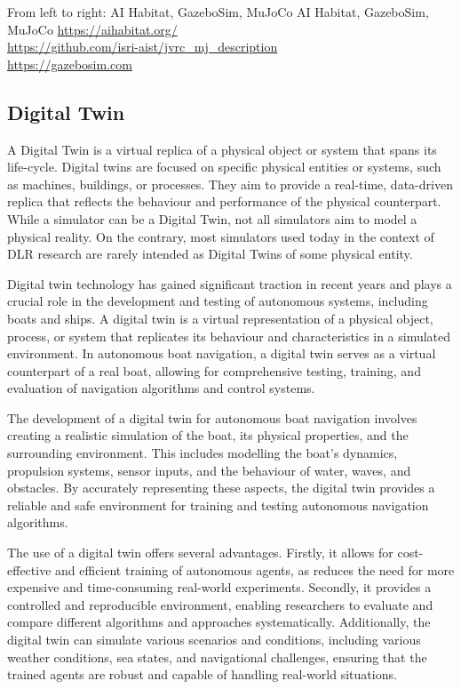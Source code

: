 {From left to right: AI Habitat, GazeboSim, MuJoCo}
{AI Habitat, GazeboSim, MuJoCo}
{
\url{https://aihabitat.org/} \\
\url{https://github.com/isri-aist/jvrc_mj_description} \\
\url{https://gazebosim.com} \\
}




\subsection{Digital Twin}

\begin{textblock}
A Digital Twin is a virtual replica of a physical object or system that spans its life-cycle. Digital twins are focused on specific physical entities or systems, such as machines, buildings, or processes. They aim to provide a real-time, data-driven replica that reflects the behaviour and performance of the physical counterpart. While a simulator can be a Digital Twin, not all simulators aim to model a physical reality. On the contrary, most simulators used today in the context of DLR research are rarely intended as Digital Twins of some physical entity.

Digital twin technology has gained significant traction in recent years and plays a crucial role in the development and testing of autonomous systems, including boats and ships. A digital twin is a virtual representation of a physical object, process, or system that replicates its behaviour and characteristics in a simulated environment. In autonomous boat navigation, a digital twin serves as a virtual counterpart of a real boat, allowing for comprehensive testing, training, and evaluation of navigation algorithms and control systems.

The development of a digital twin for autonomous boat navigation involves creating a realistic simulation of the boat, its physical properties, and the surrounding environment. This includes modelling the boat's dynamics, propulsion systems, sensor inputs, and the behaviour of water, waves, and obstacles. By accurately representing these aspects, the digital twin provides a reliable and safe environment for training and testing autonomous navigation algorithms.

The use of a digital twin offers several advantages. Firstly, it allows for cost-effective and efficient training of autonomous agents, as reduces the need for more expensive and time-consuming real-world experiments. Secondly, it provides a controlled and reproducible environment, enabling researchers to evaluate and compare different algorithms and approaches systematically. Additionally, the digital twin can simulate various scenarios and conditions, including various weather conditions, sea states, and navigational challenges, ensuring that the trained agents are robust and capable of handling real-world situations.


\end{textblock}
